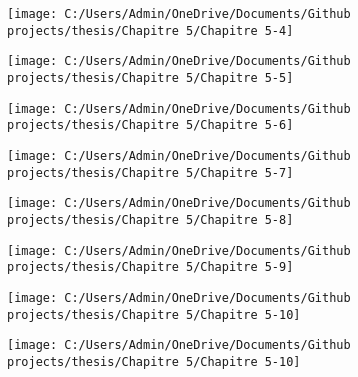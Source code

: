 \documentclass[
  english,
  man]{apa6}
\begin{document}
\begin{center}\texttt{[image: C:/Users/Admin/OneDrive/Documents/Github projects/thesis/Chapitre 5/Chapitre 5-4]} \end{center}

\begin{center}\texttt{[image: C:/Users/Admin/OneDrive/Documents/Github projects/thesis/Chapitre 5/Chapitre 5-5]} \end{center}

\begin{center}\texttt{[image: C:/Users/Admin/OneDrive/Documents/Github projects/thesis/Chapitre 5/Chapitre 5-6]} \end{center}

\begin{center}\texttt{[image: C:/Users/Admin/OneDrive/Documents/Github projects/thesis/Chapitre 5/Chapitre 5-7]} \end{center}

\begin{center}\texttt{[image: C:/Users/Admin/OneDrive/Documents/Github projects/thesis/Chapitre 5/Chapitre 5-8]} \end{center}

\begin{center}\texttt{[image: C:/Users/Admin/OneDrive/Documents/Github projects/thesis/Chapitre 5/Chapitre 5-9]} \end{center}

\begin{center}\texttt{[image: C:/Users/Admin/OneDrive/Documents/Github projects/thesis/Chapitre 5/Chapitre 5-10]} \end{center}

\begin{center}\texttt{[image: C:/Users/Admin/OneDrive/Documents/Github projects/thesis/Chapitre 5/Chapitre 5-10]} \end{center}
\end{document}
